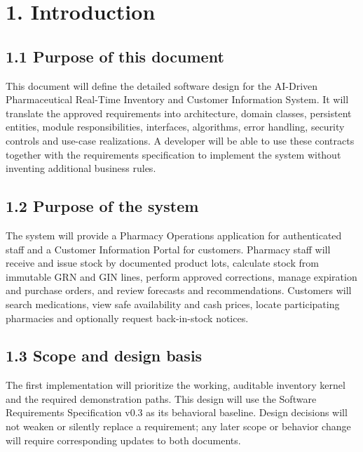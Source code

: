 \clearpage
\tableofcontents

\clearpage
\section{1. Introduction}\label{introduction}

\subsection{1.1 Purpose of this document}\label{purpose-of-this-document}

This document will define the detailed software design for the AI-Driven Pharmaceutical Real-Time Inventory and Customer Information System. It will translate the approved requirements into architecture, domain classes, persistent entities, module responsibilities, interfaces, algorithms, error handling, security controls and use-case realizations. A developer will be able to use these contracts together with the requirements specification to implement the system without inventing additional business rules.

\subsection{1.2 Purpose of the system}\label{purpose-of-the-system}

The system will provide a Pharmacy Operations application for authenticated staff and a Customer Information Portal for customers. Pharmacy staff will receive and issue stock by documented product lots, calculate stock from immutable GRN and GIN lines, perform approved corrections, manage expiration and purchase orders, and review forecasts and recommendations. Customers will search medications, view safe availability and cash prices, locate participating pharmacies and optionally request back-in-stock notices.

\subsection{1.3 Scope and design basis}\label{scope-and-design-basis}

The first implementation will prioritize the working, auditable inventory kernel and the required demonstration paths. This design will use the Software Requirements Specification v0.3 as its behavioral baseline. Design decisions will not weaken or silently replace a requirement; any later scope or behavior change will require corresponding updates to both documents.

